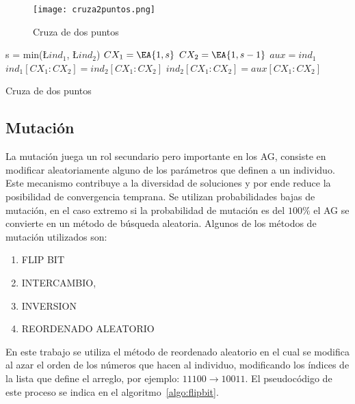 \begin{figure}[ht!]
  \centering
  \texttt{[image: cruza2puntos.png]}
  \caption{Cruza de dos puntos~\parencite{wirsansky}}\label{fig:cr2puntos}
\end{figure}


\begin{algorithm}[h!]
  \BlankLine
  s = min(\L{$ind_{1}$}, \L {$ind_{2}$})\;
  $CX_{1} = \EA{1, s}$\;
  $CX_{2} = \EA{1, s-1}$\;
  $aux = ind_{1}$\;
  $ind_{1}[CX_{1}:CX_{2}] = ind_{2}[CX_{1}:CX_{2}]$\;
  $ind_{2}[CX_{1}:CX_{2}] = aux[CX_{1}:CX_{2}]$\;
  \;
  \caption{Cruza de dos puntos}\label{algo:cr2puntos}
\end{algorithm}

\subsection{Mutación}
%
La mutación juega un rol secundario pero importante en los AG, consiste en
modificar aleatoriamente alguno de los parámetros que definen a un individuo.
%
Este mecanismo contribuye a la diversidad de soluciones y por ende reduce la posibilidad de
convergencia temprana.
%
Se utilizan probabilidades bajas de mutación, en el caso extremo si la
probabilidad de mutación es del $100\%$ el AG se convierte en un método de
búsqueda aleatoria.
%
Algunos de los métodos de mutación utilizados son:

\begin{enumerate}
  \item FLIP BIT
  \item INTERCAMBIO,
  \item INVERSION
  \item REORDENADO ALEATORIO
\end{enumerate}

En este trabajo se utiliza el método de reordenado aleatorio en el cual se
modifica al azar el orden de los números que hacen al individuo, modificando los
índices de la lista que define el arreglo, por ejemplo: $11100 \rightarrow 10011$.
%
El pseudocódigo de este proceso se indica en el algoritmo~\ref{algo:flipbit}.

